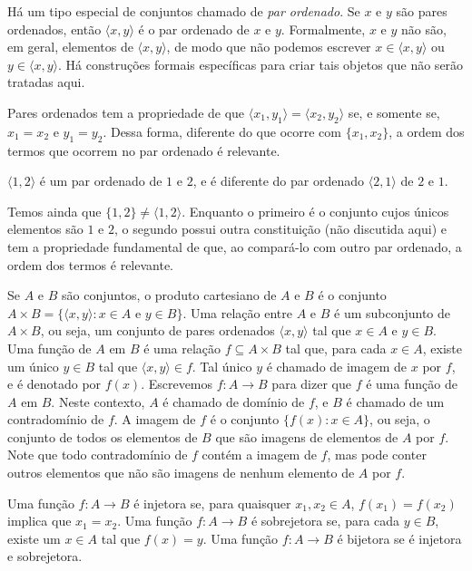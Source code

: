 Há um tipo especial de conjuntos chamado de \emph{par ordenado}.
Se $x$ e $y$ são pares ordenados, então $\langle x, y\rangle$ é o par ordenado de $x$ e $y$.
Formalmente, $x$ e $y$ não são, em geral, elementos de $\langle x, y\rangle$, de modo que não podemos escrever $x\in \langle x, y\rangle$ ou $y\in \langle x, y\rangle$.
Há construções formais específicas para criar tais objetos que não serão tratadas aqui.

Pares ordenados tem a propriedade de que $\langle x_1, y_1\rangle = \langle x_2, y_2\rangle$ se, e somente se, $x_1=x_2$ e $y_1=y_2$.
Dessa forma, diferente do que ocorre com $\{x_1, x_2\}$, a ordem dos termos que ocorrem no par ordenado é relevante.

\begin{example}
    $\langle 1, 2\rangle$ é um par ordenado de $1$ e $2$, e é diferente do par ordenado $\langle 2, 1\rangle$ de $2$ e $1$.

    Temos ainda que $\{1, 2\}\neq \langle 1, 2\rangle$.
    Enquanto o primeiro é o conjunto cujos únicos elementos são $1$ e $2$, o segundo possui outra constituição (não discutida aqui) e tem a propriedade fundamental de que, ao compará-lo com outro par ordenado, a ordem dos termos é relevante.
\end{example}

Se $A$ e $B$ são conjuntos, o produto cartesiano de $A$ e $B$ é o conjunto $A\times B=\{\langle x, y\rangle: x\in A \text{ e } y\in B\}$.
Uma relação entre $A$ e $B$ é um subconjunto de $A\times B$, ou seja, um conjunto de pares ordenados $\langle x, y\rangle$ tal que $x\in A$ e $y\in B$.
Uma função de $A$ em $B$ é uma relação $f\subseteq A\times B$ tal que, para cada $x\in A$, existe um único $y\in B$ tal que $\langle x, y\rangle \in f$.
Tal único $y$ é chamado de imagem de $x$ por $f$, e é denotado por $f(x)$.
Escrevemos $f: A\to B$ para dizer que $f$ é uma função de $A$ em $B$.
Neste contexto, $A$ é chamado de domínio de $f$, e $B$ é chamado de um contradomínio de $f$.
A imagem de $f$ é o conjunto $\{f(x): x\in A\}$, ou seja, o conjunto de todos os elementos de $B$ que são imagens de elementos de $A$ por $f$.
Note que todo contradomínio de $f$ contém a imagem de $f$, mas pode conter outros elementos que não são imagens de nenhum elemento de $A$ por $f$.

Uma função $f: A\to B$ é injetora se, para quaisquer $x_1, x_2\in A$, $f(x_1)=f(x_2)$ implica que $x_1=x_2$.
Uma função $f: A\to B$ é sobrejetora se, para cada $y\in B$, existe um $x\in A$ tal que $f(x)=y$.
Uma função $f: A\to B$ é bijetora se é injetora e sobrejetora.

